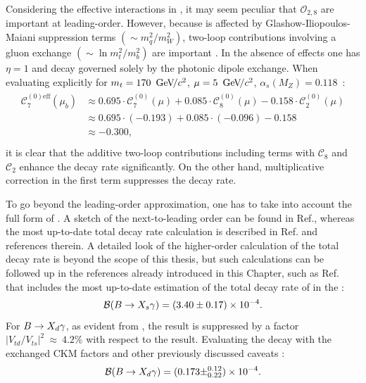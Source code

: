 Considering the effective interactions in , it may seem peculiar that $\mathcal{O}_{2,8}$ are important at leading-order.
However, because \BtoXsgamma is affected by Glashow-Iliopoulos-Maiani suppression terms $(\sim m_q^2/m_W^2)$, two-loop contributions involving a gluon exchange $(\sim\ln m_t^2/m_b^2)$ are important \cite{Bertolini:1986th}.
In the absence of \QCD effects one has $\eta=1$ and \BtoXsgamma decay governed solely by the photonic dipole exchange.
When evaluating  explicitly for $m_t=170~{\mathrm{\,Ge\kern -0.1em V\!/}c^2}$, $\mu=5~{\mathrm{\,Ge\kern -0.1em V\!/}c^2}$, $\alpha_s(M_Z)=0.118$~\cite{Buras:1998raa}:
\begin{align}
    \begin{split}
        \mathcal{C}_7^{(0)\mathrm{eff}}(\mu_b) &\approx 0.695 \cdot \mathcal{C}_7^{(0)}(\mu) + 0.085 \cdot \mathcal{C}_8^{(0)}(\mu) - 0.158 \cdot \mathcal{C}_2^{(0)}(\mu)  \\ 
                          &\approx 0.695 \cdot (-0.193) + 0.085 \cdot (-0.096) - 0.158\\
                          &\approx -0.300, \\
    \end{split}
\end{align}
it is clear that the additive \QCD two-loop contributions including terms with $\mathcal{C}_8$ and $\mathcal{C}_2$ enhance the decay rate significantly.
On the other hand, multiplicative \QCD correction in the first term suppresses the decay rate.

To go beyond the leading-order approximation, one has to take into account the full form of .
A sketch of the next-to-leading order can be found in Ref.\cite{Gambino:2001ew}, whereas the most up-to-date total decay rate calculation is described in Ref.\cite{Misiak:2020vlo} and references therein.
A detailed look of the higher-order calculation of the total \BtoXsgamma decay rate is beyond the scope of this thesis, but such calculations can be followed up in the references already introduced in this Chapter, such as Ref.~\cite{Misiak:2020vlo} that includes the most up-to-date estimation of the total decay rate of \BtoXsgamma in the \SM:
\begin{equation}\label{eq:btosgamma_theoretical}
    \mathcal{B}(\BtoXsgamma) = (3.40\pm 0.17) \times 10^{-4}.
\end{equation}
For $\BtoXdgamma$, as evident from , the result is suppressed by a factor $|V_{td}/V_{ts}|^2~\approx~4.2\%$ with respect to the \BtoXsgamma result.
Evaluating the decay with the exchanged CKM factors and other previously discussed caveats \cite{Misiak:2015xwa}:
\begin{equation}\label{eq:btodgamma_theoretical}
    \mathcal{B}(\BtoXdgamma) = (0.173\pm^{0.12}_{0.22}) \times 10^{-4}.
\end{equation}

